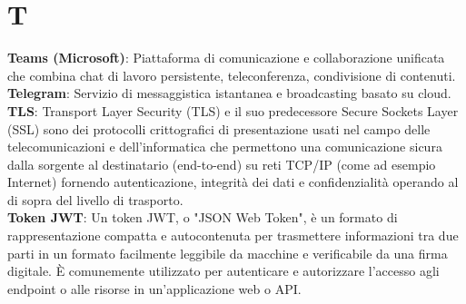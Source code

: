 \section{T}
\textbf{Teams (Microsoft)}: Piattaforma di comunicazione e collaborazione unificata che combina chat di lavoro persistente, teleconferenza, condivisione di contenuti.\\
\textbf{Telegram}: Servizio di messaggistica istantanea e broadcasting basato su cloud.\\
\textbf{TLS}: Transport Layer Security (TLS) e il suo predecessore Secure Sockets Layer (SSL) sono dei protocolli crittografici di presentazione usati nel campo delle telecomunicazioni e
dell'informatica che permettono una comunicazione sicura dalla sorgente al destinatario (end-to-end) su reti TCP/IP (come ad esempio Internet) fornendo autenticazione, 
integrità dei dati e confidenzialità operando al di sopra del livello di trasporto.\\
\textbf{Token JWT}: Un token JWT, o "JSON Web Token", è un formato di rappresentazione compatta e autocontenuta per trasmettere informazioni tra due parti in un formato facilmente leggibile da macchine e verificabile da una firma digitale. È comunemente utilizzato per autenticare e autorizzare l'accesso agli endpoint o alle risorse in un'applicazione web o API.\\
